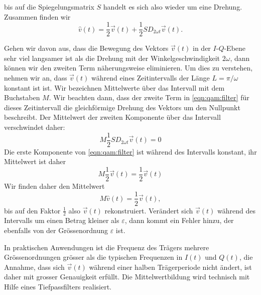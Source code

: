 bis auf die Spiegelungsmatrix $S$ handelt es sich also wieder um eine
Drehung.
Zusammen finden wir
\begin{equation}
\hat{v}(t)
=
\frac12 \vec{v}(t)
+
\frac12 SD_{2\omega t}\vec{v}(t).
\label{eqn:qam:filter}
\end{equation}

Gehen wir davon aus, dass die Bewegung des Vektors $\vec{v}(t)$ in
der $I$-$Q$-Ebene sehr viel langsamer ist als die Drehung mit der
Winkelgeschwindigkeit $2\omega$, dann können wir den zweiten Term
näherungsweise eliminieren.
Um dies zu verstehen, nehmen wir an, dass $\vec{v}(t)$ während eines
Zeitintervalls der Länge $L=\pi/\omega$ konstant ist ist.
Wir bezeichnen Mittelwerte über das Intervall mit dem Buchstaben $M$.
Wir beachten dann, dass der zweite Term in \eqref{eqn:qam:filter}
für dieses Zeitintervall die gleichförmige Drehung des Vektors
um den Nullpunkt beschreibt.
Der Mittelwert der zweiten Komponente über das Intervall verschwindet daher:
\[
M\frac12SD_{2\omega t}\vec{v}(t)
=
0
\]
Die erste Komponente von \eqref{eqn:qam:filter} ist während des Intervalls
konstant, ihr Mittelwert ist daher
\[
M\frac12\vec{v}(t)
=
\frac12\vec{v}(t)
\]
Wir finden daher den Mittelwert
\[
M\hat{v}(t)
=
\frac12\vec{v}(t),
\]
bis auf den Faktor $\frac12$ also $\vec{v}(t)$ rekonstruiert.
Verändert sich $\vec{v}(t)$ während des Intervalls um einen Betrag
kleiner als $\varepsilon$, dann kommt ein Fehler hinzu, der ebenfalls
von der Grössenordnung $\varepsilon$ ist.

In praktischen Anwendungen ist die Frequenz des Trägers mehrere
Grössenordnungen grösser als die typischen Frequenzen in $I(t)$ 
und $Q(t)$, die Annahme, dass sich $\vec{v}(t)$ während einer halben
Trägerperiode nicht ändert, ist daher mit grosser Genauigkeit erfüllt.
Die Mittelwertbildung wird technisch mit Hilfe eines Tiefpassfilters
realisiert.

